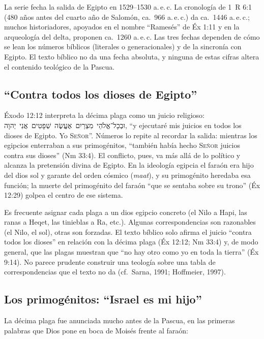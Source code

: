 \documentclass[11pt,letterpaper]{article}
\newcommand{\heb}[1]{\mbox{\foreignlanguage{hebrew}{#1}}}
\newcommand{\SENOR}{\textsc{Señor}}
\begin{document}
\begin{nota}
La serie fecha la salida de Egipto en 1529--1530 a.\,e.\,c. La cronología de 1~R 6:1 (480 años antes del cuarto año de Salomón, ca.\ 966 a.\,e.\,c.) da ca.\ 1446 a.\,e.\,c.; muchos historiadores, apoyados en el nombre ``Ramesés'' de Éx 1:11 y en la arqueología del delta, proponen ca.\ 1260 a.\,e.\,c. Las tres fechas dependen de cómo se lean los números bíblicos (literales o generacionales) y de la sincronía con Egipto. El texto bíblico no da una fecha absoluta, y ninguna de estas cifras altera el contenido teológico de la Pascua.
\end{nota}

\subsection{``Contra todos los dioses de Egipto''}
Éxodo 12:12 interpreta la décima plaga como un juicio religioso: \heb{וּבְכָל־אֱלֹהֵי מִצְרַיִם אֶעֱשֶׂה שְׁפָטִים אֲנִי יְהוָה}, ``y ejecutaré mis juicios en todos los dioses de Egipto. Yo \SENOR''. Números lo repite al recordar la salida: mientras los egipcios enterraban a sus primogénitos, ``también había hecho \SENOR{} juicios contra sus dioses'' (Nm 33:4). El conflicto, pues, va más allá de lo político y alcanza la pretensión divina de Egipto. En la ideología egipcia el faraón era hijo del dios sol y garante del orden cósmico (\emph{maat}), y su primogénito heredaba esa función; la muerte del primogénito del faraón ``que se sentaba sobre su trono'' (Éx 12:29) golpea el centro de ese sistema.

\begin{nota}[Precisión]
Es frecuente asignar cada plaga a un dios egipcio concreto (el Nilo a Hapi, las ranas a Heqet, las tinieblas a Ra, etc.). Algunas correspondencias son razonables (el Nilo, el sol), otras son forzadas. El texto bíblico solo afirma el juicio ``contra todos los dioses'' en relación con la décima plaga (Éx 12:12; Nm 33:4) y, de modo general, que las plagas muestran que ``no hay otro como yo en toda la tierra'' (Éx 9:14). No parece prudente construir una teología sobre una tabla de correspondencias que el texto no da (cf.\ Sarna, 1991; Hoffmeier, 1997).
\end{nota}

\subsection{Los primogénitos: ``Israel es mi hijo''}
La décima plaga fue anunciada mucho antes de la Pascua, en las primeras palabras que Dios pone en boca de Moisés frente al faraón:
\end{document}
